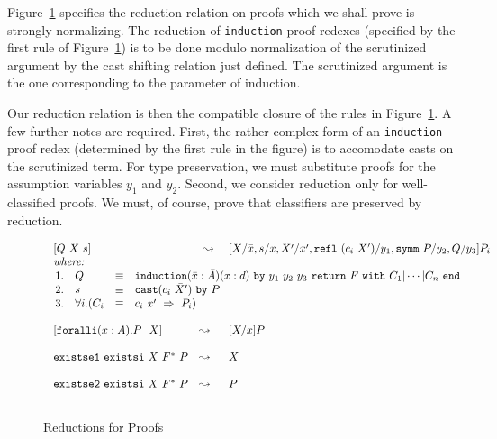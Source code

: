 \documentclass{fundam}
\begin{document}
Figure~\ref{fig:pf-red} specifies the reduction relation on proofs
which we shall prove is strongly normalizing.  The reduction of
\texttt{induction}-proof redexes (specified by the first rule of
Figure~\ref{fig:pf-red}) is to be done modulo normalization of the
scrutinized argument by the cast shifting relation just defined.  The
scrutinized argument is the one corresponding to the parameter of
induction.

Our reduction relation is then the compatible closure of the rules in
Figure~\ref{fig:pf-red}.  A few further notes are required.  First, the
rather complex form of an \texttt{induction}-proof redex (determined
by the first rule in the figure) is to accomodate casts on the
scrutinized term.  For type preservation, we must substitute proofs
for the assumption variables $y_1$ and $y_2$.  Second, we consider
reduction only for well-classified proofs.  We must, of course, prove
that classifiers are preserved by reduction.

\begin{figure}
\[
\begin{array}{lll}
\ [Q \ 
 \bar{X}\ s] & \ \leadsto\ & [\bar{X}/\bar{x},s/x,\bar{X'}/\bar{x'},\texttt{refl}\ (c_i\ \bar{X}')/y_1,\texttt{symm}\ P/y_2,Q/y_3] P_i \\
\ \textit{where:} &\ &\ \\
\multicolumn{3}{l}
{\begin{array}{llll}
1. &  Q & \equiv & \texttt{induction}(\bar{x}:\bar{A})(x:d)\ \texttt{by}\ y_1\ y_2\ y_3\ \texttt{return}\ F 
\ \texttt{with}\ C_1 | \cdots | C_n\ \texttt{end} \\
2. & s & \equiv & \texttt{cast} (c_i\ \bar{X}')\ \texttt{by}\ P \\
3. & \forall i. (C_i & \equiv & c_i\ \bar{x'} \ \Rightarrow \ P_i)
\end{array}}
\\ \\
 \ [\texttt{foralli}(x:A).P\ \ X] & \leadsto & [X/x]P
\\ \\
\ \texttt{existse1}\ \texttt{existsi}\  X\ F^*\ P & \leadsto & X \\ \\
\ \texttt{existse2}\ \texttt{existsi}\ X\ F^*\ P & \leadsto & P
\\ \\
\end{array}
\]
\caption{\label{fig:pf-red}Reductions for Proofs}
\end{figure}
\end{document}
